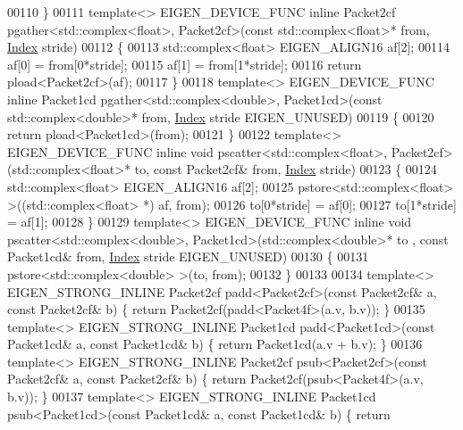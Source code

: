 \begin{DoxyCode}
00110 \}
00111 \textcolor{keyword}{template}<> EIGEN\_DEVICE\_FUNC \textcolor{keyword}{inline} Packet2cf pgather<std::complex<float>, Packet2cf>(\textcolor{keyword}{const} 
      std::complex<float>* from, \hyperlink{namespace_eigen_a62e77e0933482dafde8fe197d9a2cfde}{Index} stride)
00112 \{
00113   std::complex<float> EIGEN\_ALIGN16 af[2];
00114   af[0] = from[0*stride];
00115   af[1] = from[1*stride];
00116   \textcolor{keywordflow}{return} pload<Packet2cf>(af);
00117 \}
00118 \textcolor{keyword}{template}<> EIGEN\_DEVICE\_FUNC \textcolor{keyword}{inline} Packet1cd pgather<std::complex<double>, Packet1cd>(\textcolor{keyword}{const} 
      std::complex<double>* from, \hyperlink{namespace_eigen_a62e77e0933482dafde8fe197d9a2cfde}{Index} stride EIGEN\_UNUSED)
00119 \{
00120   \textcolor{keywordflow}{return} pload<Packet1cd>(from);
00121 \}
00122 \textcolor{keyword}{template}<> EIGEN\_DEVICE\_FUNC \textcolor{keyword}{inline} \textcolor{keywordtype}{void} pscatter<std::complex<float>, Packet2cf>(std::complex<float>* to, \textcolor{keyword}{
      const} Packet2cf& from, \hyperlink{namespace_eigen_a62e77e0933482dafde8fe197d9a2cfde}{Index} stride)
00123 \{
00124   std::complex<float> EIGEN\_ALIGN16 af[2];
00125   pstore<std::complex<float> >((std::complex<float> *) af, from);
00126   to[0*stride] = af[0];
00127   to[1*stride] = af[1];
00128 \}
00129 \textcolor{keyword}{template}<> EIGEN\_DEVICE\_FUNC \textcolor{keyword}{inline} \textcolor{keywordtype}{void} pscatter<std::complex<double>, Packet1cd>(std::complex<double>* to
      , \textcolor{keyword}{const} Packet1cd& from, \hyperlink{namespace_eigen_a62e77e0933482dafde8fe197d9a2cfde}{Index} stride EIGEN\_UNUSED)
00130 \{
00131   pstore<std::complex<double> >(to, from);
00132 \}
00133 
00134 \textcolor{keyword}{template}<> EIGEN\_STRONG\_INLINE Packet2cf padd<Packet2cf>(\textcolor{keyword}{const} Packet2cf& a, \textcolor{keyword}{const} Packet2cf& b) \{ \textcolor{keywordflow}{return} 
      Packet2cf(padd<Packet4f>(a.v, b.v)); \}
00135 \textcolor{keyword}{template}<> EIGEN\_STRONG\_INLINE Packet1cd padd<Packet1cd>(\textcolor{keyword}{const} Packet1cd& a, \textcolor{keyword}{const} Packet1cd& b) \{ \textcolor{keywordflow}{return} 
      Packet1cd(a.v + b.v); \}
00136 \textcolor{keyword}{template}<> EIGEN\_STRONG\_INLINE Packet2cf psub<Packet2cf>(\textcolor{keyword}{const} Packet2cf& a, \textcolor{keyword}{const} Packet2cf& b) \{ \textcolor{keywordflow}{return} 
      Packet2cf(psub<Packet4f>(a.v, b.v)); \}
00137 \textcolor{keyword}{template}<> EIGEN\_STRONG\_INLINE Packet1cd psub<Packet1cd>(\textcolor{keyword}{const} Packet1cd& a, \textcolor{keyword}{const} Packet1cd& b) \{ \textcolor{keywordflow}{return} 

\end{DoxyCode}
